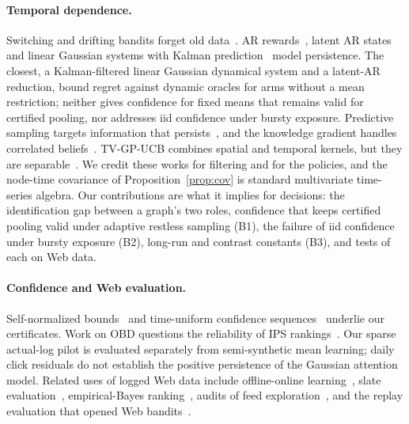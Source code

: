 \documentclass[sigconf,review,anonymous]{acmart}
\begin{document}
\paragraph{Temporal dependence.} Switching and drifting bandits forget old data~\cite{garivier2011switching,bogunovic2016tvgp,wu2019dynamic}. AR rewards~\cite{chen2023autoregressive}, latent AR states~\cite{trella2025latent} and linear Gaussian systems with Kalman prediction~\cite{gornet2024restless} model persistence. The closest, a Kalman-filtered linear Gaussian dynamical system and a latent-AR reduction, bound regret against dynamic oracles for arms without a mean restriction; neither gives confidence for fixed means that remains valid for certified pooling, nor addresses iid confidence under bursty exposure. Predictive sampling targets information that persists~\cite{liu2023predictive}, and the knowledge gradient handles correlated beliefs~\cite{frazier2009kg}. TV-GP-UCB combines spatial and temporal kernels, but they are separable~\cite{bogunovic2016tvgp}. We credit these works for filtering and for the policies, and the node-time covariance of Proposition~\ref{prop:cov} is standard multivariate time-series algebra. Our contributions are what it implies for decisions: the identification gap between a graph's two roles, confidence that keeps certified pooling valid under adaptive restless sampling (B1), the failure of iid confidence under bursty exposure (B2), long-run and contrast constants (B3), and tests of each on Web data.

\paragraph{Confidence and Web evaluation.} Self-normalized bounds~\cite{abbasi2011improved} and time-uniform confidence sequences~\cite{howard2021confidence} underlie our certificates. Work on OBD questions the reliability of IPS rankings~\cite{korovaitceva2026ips}. Our sparse actual-log pilot is evaluated separately from semi-synthetic mean learning; daily click residuals do not establish the positive persistence of the Gaussian attention model. Related uses of logged Web data include offline-online learning~\cite{li2021unifying}, slate evaluation~\cite{kiyohara2024slate}, empirical-Bayes ranking~\cite{yang2024empirical,wang2021hybrid}, audits of feed exploration~\cite{vombatkere2024tiktok}, and the replay evaluation that opened Web bandits~\cite{li2010linucb}.

\end{document}
